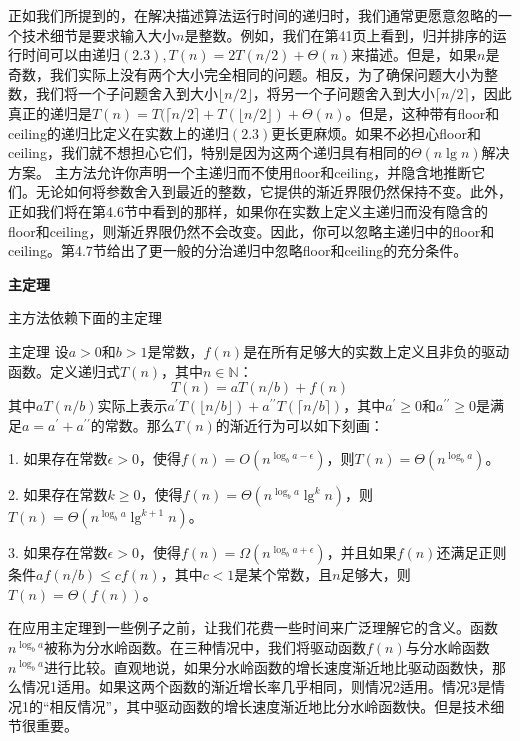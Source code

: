 \documentclass[lang=cn,newtx,10pt,scheme=chinese]{elegantbook}
\begin{document}
正如我们所提到的，在解决描述算法运行时间的递归时，我们通常更愿意忽略的一个技术细节是要求输入大小$n$是整数。例如，我们在第41页上看到，归并排序的运行时间可以由递归$(2.3), T(n)=2 T(n / 2)+\Theta(n)$来描述。但是，如果$n$是奇数，我们实际上没有两个大小完全相同的问题。相反，为了确保问题大小为整数，我们将一个子问题舍入到大小$\lfloor n / 2\rfloor$，将另一个子问题舍入到大小$\lceil n / 2\rceil$，因此真正的递归是$T(n)=T(\lceil n / 2\rceil+T(\lfloor n / 2\rfloor)+\Theta(n)$。但是，这种带有floor和ceiling的递归比定义在实数上的递归$(2.3)$更长更麻烦。如果不必担心floor和ceiling，我们就不想担心它们，特别是因为这两个递归具有相同的$\Theta(n \lg n)$解决方案。
主方法允许你声明一个主递归而不使用floor和ceiling，并隐含地推断它们。无论如何将参数舍入到最近的整数，它提供的渐近界限仍然保持不变。此外，正如我们将在第4.6节中看到的那样，如果你在实数上定义主递归而没有隐含的floor和ceiling，则渐近界限仍然不会改变。因此，你可以忽略主递归中的floor和ceiling。第4.7节给出了更一般的分治递归中忽略floor和ceiling的充分条件。

\textbf{主定理}

主方法依赖下面的主定理

\begin{theorem}{主定理}{}
设$a>0$和$b>1$是常数，$f(n)$是在所有足够大的实数上定义且非负的驱动函数。定义递归式$T(n)$，其中$n \in \mathbb{N}$：
$$
T(n)=a T(n / b)+f(n)
$$
其中$a T(n / b)$实际上表示$a^{\prime} T(\lfloor n / b\rfloor)+a^{\prime \prime} T(\lceil n / b\rceil)$，其中$a^{\prime} \geq 0$和$a^{\prime \prime} \geq 0$是满足$a=a^{\prime}+a^{\prime \prime}$的常数。那么$T(n)$的渐近行为可以如下刻画：

1. 如果存在常数$\epsilon>0$，使得$f(n)=O\left(n^{\log _b a-\epsilon}\right)$，则$T(n)=\Theta\left(n^{\log _b a}\right)$。

2. 如果存在常数$k \geq 0$，使得$f(n)=\Theta\left(n^{\log _b a} \lg ^k n\right)$，则$T(n)=\Theta\left(n^{\log _b a} \lg ^{k+1} n\right)$。

3. 如果存在常数$\epsilon>0$，使得$f(n)=\Omega\left(n^{\log _b a+\epsilon}\right)$，并且如果$f(n)$还满足正则条件$a f(n / b) \leq c f(n)$，其中$c<1$是某个常数，且$n$足够大，则$T(n)=\Theta(f(n))$。
\end{theorem}

在应用主定理到一些例子之前，让我们花费一些时间来广泛理解它的含义。函数$n^{\log _b a}$被称为分水岭函数。在三种情况中，我们将驱动函数$f(n)$与分水岭函数$n^{\log _b a}$进行比较。直观地说，如果分水岭函数的增长速度渐近地比驱动函数快，那么情况1适用。如果这两个函数的渐近增长率几乎相同，则情况2适用。情况3是情况1的“相反情况”，其中驱动函数的增长速度渐近地比分水岭函数快。但是技术细节很重要。
\end{document}
